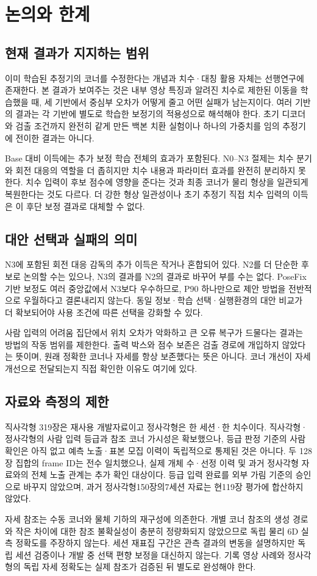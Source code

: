 \section{논의와 한계}\label{sec:discussion}
\subsection{현재 결과가 지지하는 범위}
이미 학습된 추정기의 코너를 수정한다는 개념과 치수·대칭 활용 자체는 선행연구에 존재한다. 본 결과가 보여주는 것은 내부 영상 특징과 알려진 치수로 제한된 이동을 학습했을 때, 세 기반에서 중심부 오차가 어떻게 줄고 어떤 실패가 남는지이다. 여러 기반의 결과는 각 기반에 별도로 학습한 보정기의 적용성으로 해석해야 한다. 초기 디코더와 검출 조건까지 완전히 같게 만든 백본 치환 실험이나 하나의 가중치를 임의 추정기에 전이한 결과는 아니다.

Base 대비 이득에는 추가 보정 학습 전체의 효과가 포함된다. N0--N3 절제는 치수 분기와 회전 대응의 역할을 더 좁히지만 치수 내용과 파라미터 효과를 완전히 분리하지 못한다. 치수 입력이 후보 점수에 영향을 준다는 것과 최종 코너가 물리 형상을 일관되게 복원한다는 것도 다르다. 더 강한 형상 일관성이나 초기 추정기 직접 치수 입력의 이득은 이 후단 보정 결과로 대체할 수 없다.

\subsection{대안 선택과 실패의 의미}
N3에 포함된 회전 대응 감독의 추가 이득은 작거나 혼합되어 있다. N2를 더 단순한 후보로 논의할 수는 있으나, N3의 결과를 N2의 결과로 바꾸어 부를 수는 없다. PoseFix 기반 보정도 여러 중앙값에서 N3보다 우수하므로, P90 하나만으로 제안 방법을 전반적으로 우월하다고 결론내리지 않는다. 동일 정보·학습 선택·실행환경의 대안 비교가 더 확보되어야 사용 조건에 따른 선택을 강화할 수 있다.

사람 입력의 어려움 집단에서 위치 오차가 악화하고 큰 오류 복구가 드물다는 결과는 방법의 작동 범위를 제한한다. 출력 박스와 점수 보존은 검출 경로에 개입하지 않았다는 뜻이며, 원래 정확한 코너나 자세를 항상 보존했다는 뜻은 아니다. 코너 개선이 자세 개선으로 전달되는지 직접 확인한 이유도 여기에 있다.

\subsection{자료와 측정의 제한}
직사각형 319장은 재사용 개발자료이고 정사각형은 한 세션·한 치수이다. 직사각형·정사각형의 사람 입력 등급과 참조 코너 가시성은 확보했으나, 등급 판정 기준의 사람 확인은 아직 없고 예측 노출·표본 모집 이력이 독립적으로 통제된 것은 아니다. 두 128장 집합의 frame ID는 전수 일치했으나, 실제 개체 수·선정 이력 및 과거 정사각형 자료와의 전체 노출 관계는 추가 확인 대상이다. 등급 입력 완료를 외부 가림 기준의 승인으로 바꾸지 않았으며, 과거 정사각형150장의7세션 자료는 현119장 평가에 합산하지 않았다.

자세 참조는 수동 코너와 물체 기하의 재구성에 의존한다. 개별 코너 참조의 생성 경로와 작은 차이에 대한 참조 불확실성이 충분히 정량화되지 않았으므로 독립 물리 6D 실측 정확도를 주장하지 않는다. 세션 재표집 구간은 관측 결과의 변동을 설명하지만 독립 세션 검증이나 개발 중 선택 편향 보정을 대신하지 않는다. 기록 영상 사례와 정사각형의 독립 자세 정확도는 실제 참조가 검증된 뒤 별도로 완성해야 한다.
